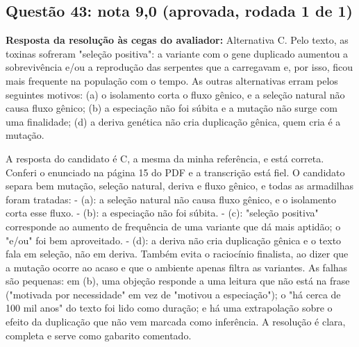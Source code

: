 \documentclass{article}%
\begin{document}
\subsection*{Questão 43: nota 9,0 (aprovada, rodada 1 de 1)}%
\textbf{Resposta da resolução às cegas do avaliador:} Alternativa C. Pelo texto, as toxinas sofreram "seleção positiva": a variante com o gene duplicado aumentou a sobrevivência e/ou a reprodução das serpentes que a carregavam e, por isso, ficou mais frequente na população com o tempo. As outras alternativas erram pelos seguintes motivos: (a) o isolamento corta o fluxo gênico, e a seleção natural não causa fluxo gênico; (b) a especiação não foi súbita e a mutação não surge com uma finalidade; (d) a deriva genética não cria duplicação gênica, quem cria é a mutação.\par %
A resposta do candidato é C, a mesma da minha referência, e está correta. Conferi o enunciado na página 15 do PDF e a transcrição está fiel. O candidato separa bem mutação, seleção natural, deriva e fluxo gênico, e todas as armadilhas foram tratadas:\newline%
{-} (a): a seleção natural não causa fluxo gênico, e o isolamento corta esse fluxo.\newline%
{-} (b): a especiação não foi súbita.\newline%
{-} (c): "seleção positiva" corresponde ao aumento de frequência de uma variante que dá mais aptidão; o "e/ou" foi bem aproveitado.\newline%
{-} (d): a deriva não cria duplicação gênica e o texto fala em seleção, não em deriva.\newline%
\newline%
Também evita o raciocínio finalista, ao dizer que a mutação ocorre ao acaso e que o ambiente apenas filtra as variantes. As falhas são pequenas: em (b), uma objeção responde a uma leitura que não está na frase ("motivada por necessidade" em vez de "motivou a especiação"); o "há cerca de 100 mil anos" do texto foi lido como duração; e há uma extrapolação sobre o efeito da duplicação que não vem marcada como inferência. A resolução é clara, completa e serve como gabarito comentado.%
\end{document}
